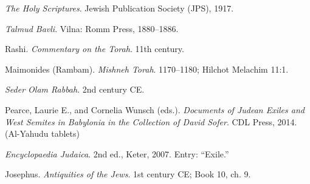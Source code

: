 \documentclass[12pt]{article}
\begin{document}
\begin{thebibliography}{9}

\textit{The Holy Scriptures}. Jewish Publication Society (JPS), 1917.

\textit{Talmud Bavli}. Vilna: Romm Press, 1880–1886.

Rashi. \textit{Commentary on the Torah}. 11th century.

Maimonides (Rambam). \textit{Mishneh Torah}. 1170–1180; Hilchot Melachim 11:1.

\textit{Seder Olam Rabbah}. 2nd century CE.

Pearce, Laurie E., and Cornelia Wunsch (eds.). \textit{Documents of Judean Exiles and West Semites in Babylonia in the Collection of David Sofer}. CDL Press, 2014. (Al-Yahudu tablets)

\textit{Encyclopaedia Judaica}. 2nd ed., Keter, 2007. Entry: “Exile.”

Josephus. \textit{Antiquities of the Jews}. 1st century CE; Book 10, ch. 9.

\end{thebibliography}
\end{document}
